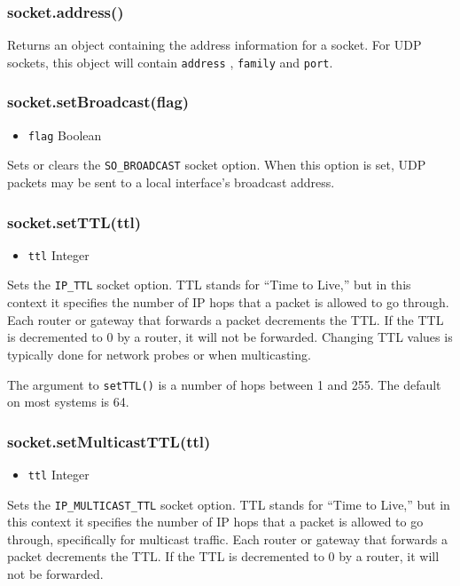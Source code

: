 \subsubsection{socket.address()}

Returns an object containing the address information for a socket. For
UDP sockets, this object will contain \texttt{address} , \texttt{family}
and \texttt{port}.

\subsubsection{socket.setBroadcast(flag)}

\begin{itemize}
\item
  \texttt{flag} Boolean
\end{itemize}

Sets or clears the \texttt{SO\_BROADCAST} socket option. When this
option is set, UDP packets may be sent to a local interface's broadcast
address.

\subsubsection{socket.setTTL(ttl)}

\begin{itemize}
\item
  \texttt{ttl} Integer
\end{itemize}

Sets the \texttt{IP\_TTL} socket option. TTL stands for ``Time to
Live,'' but in this context it specifies the number of IP hops that a
packet is allowed to go through. Each router or gateway that forwards a
packet decrements the TTL. If the TTL is decremented to 0 by a router,
it will not be forwarded. Changing TTL values is typically done for
network probes or when multicasting.

The argument to \texttt{setTTL()} is a number of hops between 1 and 255.
The default on most systems is 64.

\subsubsection{socket.setMulticastTTL(ttl)}

\begin{itemize}
\item
  \texttt{ttl} Integer
\end{itemize}

Sets the \texttt{IP\_MULTICAST\_TTL} socket option. TTL stands for
``Time to Live,'' but in this context it specifies the number of IP hops
that a packet is allowed to go through, specifically for multicast
traffic. Each router or gateway that forwards a packet decrements the
TTL. If the TTL is decremented to 0 by a router, it will not be
forwarded.

